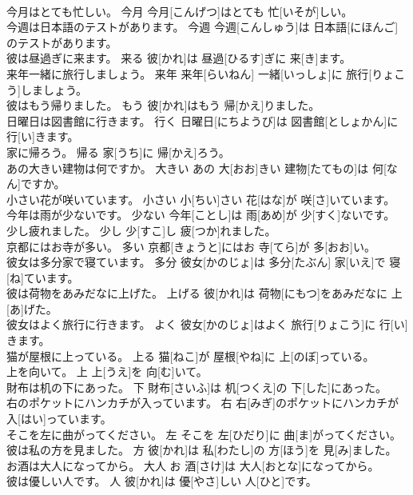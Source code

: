\documentclass[8pt]{extreport}
\begin{document}
\begin{CJK}{UTF8}{min}
\\	今月はとても忙しい。	今月	今月[こんげつ]はとても 忙[いそが]しい。	
\\	今週は日本語のテストがあります。	今週	今週[こんしゅう]は 日本語[にほんご]のテストがあります。	
\\	彼は昼過ぎに来ます。	来る	彼[かれ]は 昼過[ひるす]ぎに 来[き]ます。	
\\	来年一緒に旅行しましょう。	来年	来年[らいねん] 一緒[いっしょ]に 旅行[りょこう]しましょう。	
\\	彼はもう帰りました。	もう	彼[かれ]はもう 帰[かえ]りました。	
\\	日曜日は図書館に行きます。	行く	日曜日[にちようび]は 図書館[としょかん]に 行[い]きます。	
\\	家に帰ろう。	帰る	家[うち]に 帰[かえ]ろう。	
\\	あの大きい建物は何ですか。	大きい	あの 大[おお]きい 建物[たてもの]は 何[なん]ですか。	
\\	小さい花が咲いています。	小さい	小[ちい]さい 花[はな]が 咲[さ]いています。	
\\	今年は雨が少ないです。	少ない	今年[ことし]は 雨[あめ]が 少[すく]ないです。	
\\	少し疲れました。	少し	少[すこ]し 疲[つか]れました。	
\\	京都にはお寺が多い。	多い	京都[きょうと]にはお 寺[てら]が 多[おお]い。	
\\	彼女は多分家で寝ています。	多分	彼女[かのじょ]は 多分[たぶん] 家[いえ]で 寝[ね]ています。	
\\	彼は荷物をあみだなに上げた。	上げる	彼[かれ]は 荷物[にもつ]をあみだなに 上[あ]げた。	
\\	彼女はよく旅行に行きます。	よく	彼女[かのじょ]はよく 旅行[りょこう]に 行[い]きます。	
\\	猫が屋根に上っている。	上る	猫[ねこ]が 屋根[やね]に 上[のぼ]っている。	
\\	上を向いて。	上	上[うえ]を 向[む]いて。	
\\	財布は机の下にあった。	下	財布[さいふ]は 机[つくえ]の 下[した]にあった。	
\\	右のポケットにハンカチが入っています。	右	右[みぎ]のポケットにハンカチが 入[はい]っています。	
\\	そこを左に曲がってください。	左	そこを 左[ひだり]に 曲[ま]がってください。	
\\	彼は私の方を見ました。	方	彼[かれ]は 私[わたし]の 方[ほう]を 見[み]ました。	
\\	お酒は大人になってから。	大人	お 酒[さけ]は 大人[おとな]になってから。	
\\	彼は優しい人です。	人	彼[かれ]は 優[やさ]しい 人[ひと]です。	

\end{CJK}
\end{document}
